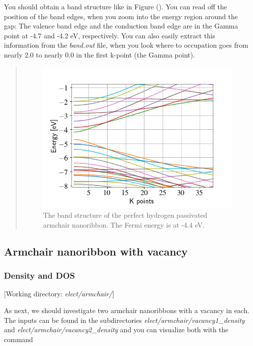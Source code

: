\documentclass[a4paper,11pt,english]{sphinxmanual}
\begin{document}
{{You should obtain a band structure like in Figure
{\hyperref[electstruct:fig-armchair-perfect-band]{\emph{}}} (). You can read off the position of the
band edges, when you zoom into the energy region around the gap: The
valence band edge and the conduction band edge are in the Gamma point
at -4.7 and -4.2 eV, respectively. You can also easily extract this
information from the \emph{band.out} file, when you look where to
occupation goes from nearly 2.0 to nearly 0.0 in the first k-point
(the Gamma point).
\begin{quote}
\begin{figure}[htbp]
\centering
\capstart
\includegraphics[width=0.650\linewidth]{armchair-perfect-band.png}
\caption{The band structure of the perfect hydrogen passivated armchair
nanoribbon. The Fermi energy is at -4.4 eV.}\label{electstruct:fig-armchair-perfect-band}\end{figure}
\end{quote}


\subsection{Armchair nanoribbon with vacancy}
\label{electstruct:armchair-nanoribbon-with-vacancy}

\subsubsection{Density and DOS}
\label{electstruct:density-and-dos}
{[}Working directory: \emph{elect/armchair/}{]}

As next, we should investigate two armchair nanoribbons with a vacancy
in each. The inputs can be found in the subdirectories
\emph{elect/armchair/vacancy1\_density} and
\emph{elect/armchair/vacancy2\_density} and you can visualize both with the
command

}}
\end{document}
